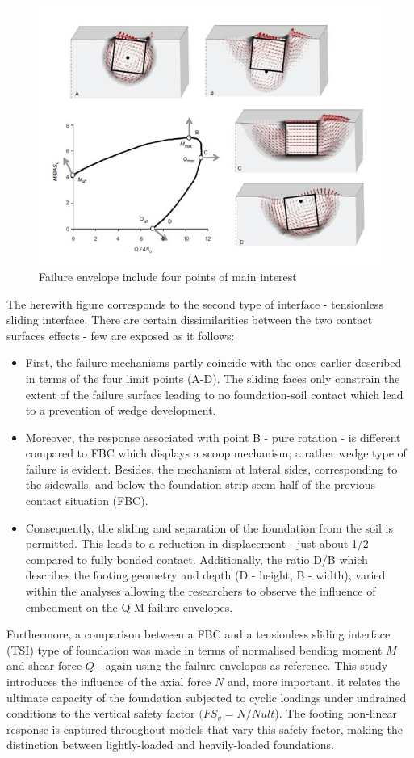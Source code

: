 \documentclass[12pt,a4paper]{report}
\begin{document}
\begin{figure}[h!]
	\centering
		\includegraphics[width=0.8\linewidth]{"MQN"}
		\caption{Failure envelope include four points of main interest}
		\label{MQN}
\end{figure}

The herewith figure corresponds to the second type of interface - tensionless sliding interface. There are certain dissimilarities between the two contact surfaces effects - few are exposed as it follows:
\begin{itemize}
	\item First, the failure mechanisms partly coincide with the ones earlier described in terms of the four limit points (A-D). The sliding faces only constrain the extent of the failure surface leading to no foundation-soil contact which lead to a prevention of wedge development.
	\item Moreover, the response associated with point B - pure rotation - is different compared to FBC which displays a scoop mechanism; a rather wedge type of failure is evident. Besides, the mechanism at lateral sides, corresponding to the sidewalls, and below the foundation strip seem half of the previous contact situation (FBC).
	\item Consequently, the sliding and separation of the foundation from the soil is permitted. This leads to a reduction in displacement - just about 1/2 compared to fully bonded contact. Additionally, the ratio D/B which describes the footing geometry and depth (D - height, B - width), varied within the analyses allowing the researchers to observe the influence of embedment on the Q-M failure envelopes. 
\end{itemize}

Furthermore, a comparison between a FBC and a tensionless sliding interface (TSI) type of foundation was made in terms of normalised bending moment $M$ and shear force $Q$ - again using the failure envelopes as reference. This study introduces the influence of the axial force $N$ and, more important, it relates the ultimate capacity of the foundation subjected to cyclic loadings under undrained conditions to the vertical safety factor $(FS_v = N/Nult$). The footing non-linear response is captured throughout models that vary this safety factor, making the distinction between lightly-loaded and heavily-loaded foundations. 
\end{document}
